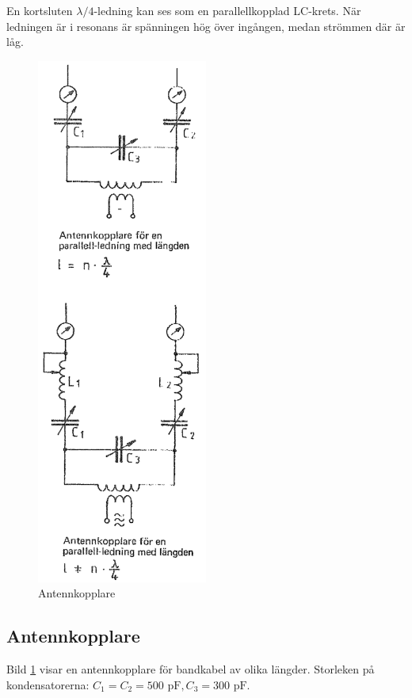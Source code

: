 En kortsluten \(\lambda/4\)-ledning kan ses som en parallellkopplad
LC-krets. När ledningen är i resonans är spänningen hög över ingången,
medan strömmen där är låg.

\clearpage %
%
\begin{figure}
  \includegraphics[width=0.5\textwidth]{images/cropped_pdfs/bild_2_6-36.pdf}
  \caption{Antennkopplare}
  \label{fig:bildII6-36}
\end{figure}
%
\subsection{Antennkopplare}
%
Bild \ref{fig:bildII6-36} visar en antennkopplare för bandkabel av olika
längder. Storleken på kondensatorerna: \(C_1 = C_2 = 500\text{ pF},
C_3 = 300\text{ pF}\).

